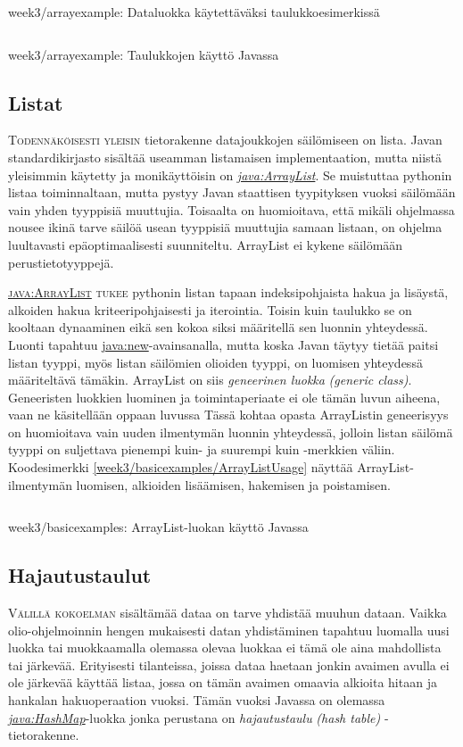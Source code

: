 \documentclass[openany]{book}
\newcommand{\newthought}[1]{\smallskip\textsc{#1}}
\newcommand{\eng}[1]{\textit{(#1)}}
\newcommand{\new}[1]{\textit{\gls{#1}}}
\newcommand{\neweng}[2]{\new{#1} \eng{#2}}
\newcommand{\java}[1]{\underline{\gls{java:#1}}}
\newcommand{\newjava}[1]{\textit{\java{#1}}}
\newcommand{\code}[3]{
	\begin{listing}
		\linespread{0.85}
		\inputminted{java}{OhjelmointiopasEsimerkit/src/#1/#2.java}
		\caption{#1: #3}
		\label{#1/#2}
	\end{listing}
}
\begin{document}
\code{week3/arrayexample}{DataPoint}{Dataluokka käytettäväksi taulukkoesimerkissä}
\code{week3/arrayexample}{ArrayExample}{Taulukkojen käyttö Javassa}

\subsection{Listat}
\label{listat}

\newthought{Todennäköisesti yleisin} tietorakenne datajoukkojen säilömiseen on lista. Javan
standardikirjasto sisältää useamman listamaisen implementaation, mutta niistä yleisimmin käytetty 
ja monikäyttöisin on \newjava{ArrayList}. Se muistuttaa pythonin listaa toiminnaltaan, mutta
pystyy Javan staattisen tyypityksen vuoksi säilömään vain yhden tyyppisiä muuttujia. Toisaalta on
huomioitava, että mikäli ohjelmassa nousee ikinä tarve säilöä usean tyyppisiä muuttujia samaan
listaan, on ohjelma luultavasti epäoptimaalisesti suunniteltu. ArrayList ei kykene säilömään
perustietotyyppejä.

\newthought{\java{ArrayList} tukee} pythonin listan tapaan indeksipohjaista hakua ja lisäystä,
alkoiden hakua kriteeripohjaisesti ja iterointia. Toisin kuin taulukko se on kooltaan dynaaminen
eikä sen kokoa siksi määritellä sen luonnin yhteydessä. Luonti tapahtuu \java{new}-avainsanalla,
mutta koska Javan täytyy tietää paitsi listan tyyppi, myös listan säilömien olioiden tyyppi, on
luomisen yhteydessä määriteltävä tämäkin. ArrayList on siis \neweng{geneerinen luokka}{generic
class}. Geneeristen luokkien luominen ja toimintaperiaate ei ole tämän luvun aiheena, vaan ne
käsitellään oppaan luvussa  Tässä kohtaa opasta ArrayListin geneerisyys on
huomioitava vain uuden ilmentymän luonnin yhteydessä, jolloin listan säilömä tyyppi on suljettava
pienempi kuin- ja suurempi kuin -merkkien väliin. Koodesimerkki
\ref{week3/basicexamples/ArrayListUsage} näyttää ArrayList-ilmentymän luomisen, alkioiden
lisäämisen, hakemisen ja poistamisen.

\code{week3/basicexamples}{ArrayListUsage}{ArrayList-luokan käyttö Javassa}

\subsection{Hajautustaulut}
\label{HashMap}

\newthought{Välillä kokoelman} sisältämää dataa on tarve yhdistää muuhun dataan. Vaikka
olio-ohjelmoinnin hengen mukaisesti datan yhdistäminen tapahtuu luomalla uusi luokka tai
muokkaamalla olemassa olevaa luokkaa ei tämä ole aina mahdollista tai järkevää. Erityisesti
tilanteissa, joissa dataa haetaan jonkin avaimen avulla ei ole järkevää käyttää listaa, jossa on
tämän avaimen omaavia alkioita hitaan ja hankalan hakuoperaation vuoksi. Tämän vuoksi Javassa
on olemassa \newjava{HashMap}-luokka jonka perustana on \neweng{hajautustaulu}{hash table}
-tietorakenne.
\end{document}
